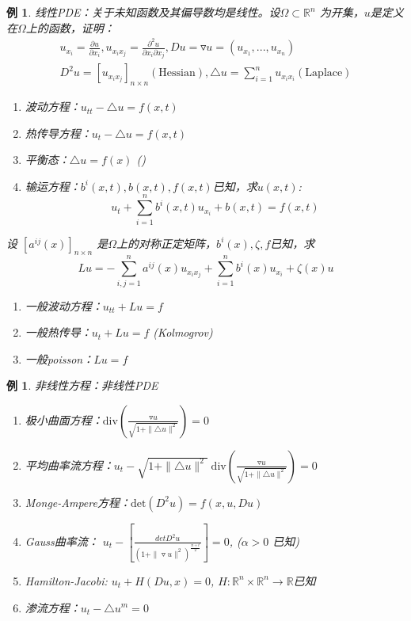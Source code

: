 \documentclass[11pt, a4paper]{article}
\theoremstyle{theorem}
\newtheorem{eg}[thm]{例}
\begin{document}
\begin{eg}
线性PDE：关于未知函数及其偏导数均是线性。设$\Omega \subset \mathbb{R}^n$ 为开集，$u$是定义在$\Omega$上的函数，证明：
\begin{align*}
u_{x_i} = \frac{\partial u}{\partial x_i}, u_{x_ix_j} = \frac{\partial^2 u}{\partial x_i \partial x_j}, Du = \triangledown u = (u_{x_1}, ..., u_{x_n}) \\
D^2 u = [u_{x_ix_j}]_{n\times n} (\text{Hessian}), \triangle u = \sum_{i=1}^n u_{x_ix_i} (\text{Laplace})
\end{align*}
\begin{enumerate}
    \item 波动方程：$u_{tt} - \triangle u = f(x,t)$
    \item 热传导方程：$u_{t} - \triangle u = f(x,t)$
    \item 平衡态：$\triangle u = f(x)$ ()
    \item 输运方程：$b^i(x,t), b(x,t), f(x,t)$已知，求$u(x,t)$:
    $$u_t + \sum_{i=1}^n b^i(x,t) u_{x_i} + b(x,t) = f(x,t)$$
\end{enumerate}

设 $[a^{ij}(x)]_{n\times n}$ 是$\Omega$上的对称正定矩阵，$b^i(x), \zeta, f$已知，求
$$
Lu = - \sum_{i,j = 1}^n a^{ij}(x) u_{x_ix_j} + \sum_{i=1}^n b^i(x) u_{x_i} + \zeta(x) u
$$
\begin{enumerate}
    \item 一般波动方程：$u_{tt} + Lu = f$
    \item 一般热传导：$u_t + Lu = f$ (Kolmogrov)
    \item 一般poisson：$Lu = f$
\end{enumerate}
\end{eg}

\begin{eg}
非线性方程：非线性PDE
\begin{enumerate}
    \item 极小曲面方程：$\text{div} \left(\frac{\triangledown u}{\sqrt{1 + \|\triangle u\|^2}}\right) = 0$
    \item 平均曲率流方程：$u_t - \sqrt{1 + \|\triangle u\|^2} \; \text{div} \left(\frac{\triangledown u}{\sqrt{1 + \|\triangle u\|^2}}\right) = 0$
    \item Monge-Ampere方程：$\text{det}(D^2 u) = f(x,u,Du)$
    \item Gauss曲率流： $u_t - \left[\frac{det D^2u}{(1 + \|\triangledown u\|^2)^{\frac{n+t}{2}}}\right] = 0$, ($\alpha > 0$ 已知)
    \item Hamilton-Jacobi: $u_t + H(Du,x) = 0$, $H: \mathbb{R}^n \times \mathbb{R}^n \rightarrow \mathbb{R}$已知
    \item 渗流方程：$u_t - \triangle u^m = 0$
\end{enumerate}
\end{eg}
\end{document}
